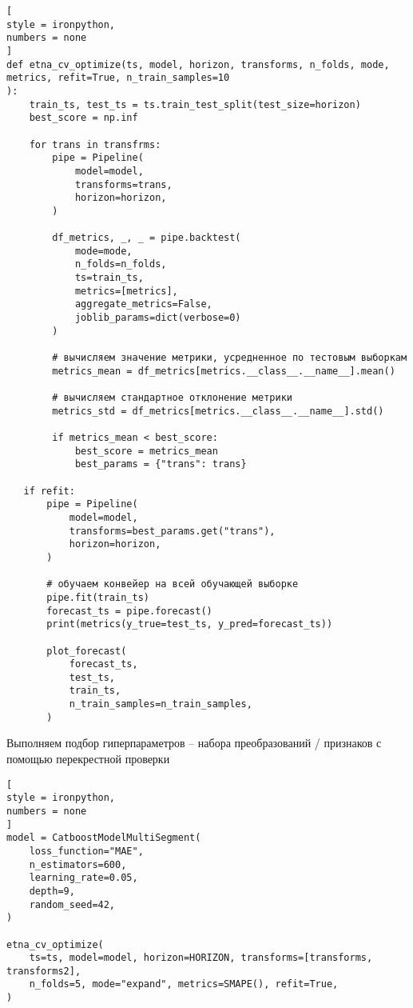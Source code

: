 \documentclass[%
	11pt,
	a4paper,
	utf8,
		]{article}
\begin{document}
\begin{lstlisting}[
style = ironpython,
numbers = none	
]
def etna_cv_optimize(ts, model, horizon, transforms, n_folds, mode, metrics, refit=True, n_train_samples=10
):
    train_ts, test_ts = ts.train_test_split(test_size=horizon)
    best_score = np.inf
    
    for trans in transfrms:
        pipe = Pipeline(
            model=model,
            transforms=trans,
            horizon=horizon,
        )
        
        df_metrics, _, _ = pipe.backtest(
            mode=mode,
            n_folds=n_folds,
            ts=train_ts,
            metrics=[metrics],
            aggregate_metrics=False,
            joblib_params=dict(verbose=0)
        )
        
        # вычисляем значение метрики, усредненное по тестовым выборкам
        metrics_mean = df_metrics[metrics.__class__.__name__].mean()
        
        # вычисляем стандартное отклонение метрики
        metrics_std = df_metrics[metrics.__class__.__name__].std()
        
        if metrics_mean < best_score:
            best_score = metrics_mean
            best_params = {"trans": trans}
   
   if refit:
       pipe = Pipeline(
           model=model,
           transforms=best_params.get("trans"), 
           horizon=horizon,
       )
       
       # обучаем конвейер на всей обучающей выборке
       pipe.fit(train_ts)
       forecast_ts = pipe.forecast()
       print(metrics(y_true=test_ts, y_pred=forecast_ts))
       
       plot_forecast(
           forecast_ts,
           test_ts,
           train_ts,
           n_train_samples=n_train_samples,
       )
\end{lstlisting}

Выполняем подбор гиперпараметров -- набора преобразований / признаков с помощью перекрестной проверки
\begin{lstlisting}[
style = ironpython,
numbers = none
]
model = CatboostModelMultiSegment(
    loss_function="MAE",
    n_estimators=600,
    learning_rate=0.05,
    depth=9,
    random_seed=42,
)

etna_cv_optimize(
    ts=ts, model=model, horizon=HORIZON, transforms=[transforms, transforms2],
    n_folds=5, mode="expand", metrics=SMAPE(), refit=True, 
)
\end{lstlisting}
\end{document}
